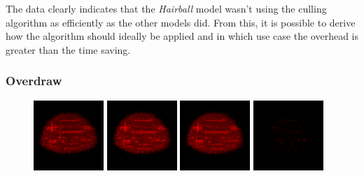\noindent
The data clearly indicates that the \emph{Hairball} model wasn't using the culling algorithm as efficiently as 
the other models did. From this, it is possible to derive how the algorithm should ideally be applied and in 
which use case the overhead is greater than the time saving.

\subsubsection*{Overdraw}

\begin{figure}[!htb]
  \centering  
  \includegraphics[height=100px]{images/graphics/overdraw-hairball1-nocull.png}
  \includegraphics[height=100px]{images/graphics/overdraw-hairball1-pooc.png}
  \includegraphics[height=100px]{images/graphics/overdraw-hairball1-pmoc.png}
  \includegraphics[height=100px]{images/graphics/overdraw-hairball1-diff.png}


\end{figure}
